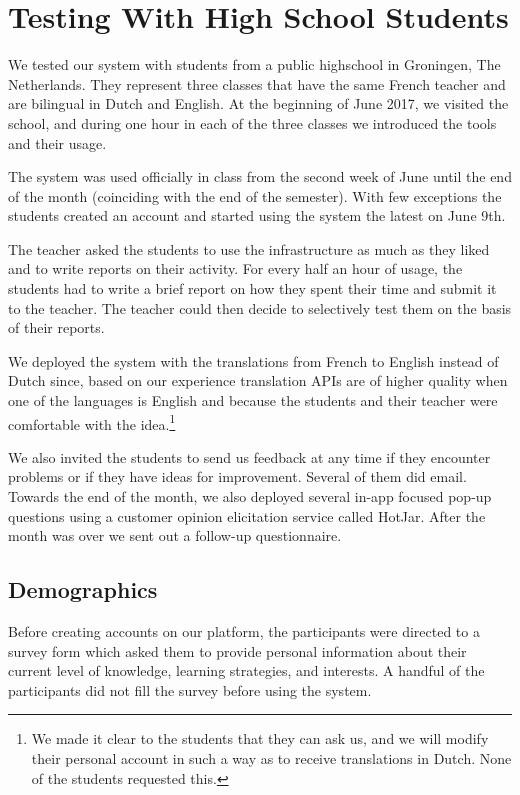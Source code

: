 
\newpage
\section{Testing With High School Students}
\label{sec:demographics}

We tested our system with \stcnt students from a public highschool in Groningen, The Netherlands. They represent three classes that have the same French teacher and are bilingual in Dutch and English. At the beginning of June 2017, we visited the school, and during one hour in each of the three classes we introduced the tools and their usage.

The system was used officially in class from the second week of June until the end of the month (coinciding with the end of the semester). With few exceptions the students created an account and started using the system the latest on June 9th. 

The teacher asked the students to use the infrastructure as much as they liked and to write reports on their activity. For every half an hour of usage, the students had to write a brief report on how they spent their time and submit it to the teacher. The teacher could then decide to selectively test them on the basis of their reports.

We deployed the system with the translations from French to English instead of Dutch since, based on our experience translation APIs are of higher quality when one of the languages is English and because the students and their teacher were comfortable with the idea.\footnote{We made it clear to the students that they can ask us, and we will modify their personal account in such a way as to receive translations in Dutch. None of the students requested this.}

We also invited the students to send us feedback at any time if they encounter problems or if they have ideas for improvement. Several of them did email. Towards the end of the month, we also deployed several in-app focused pop-up questions using a customer opinion elicitation service called HotJar. After the month was over we sent out a follow-up questionnaire.

\subsection{Demographics}

Before creating accounts on our platform, the participants were directed to a survey form which asked them to provide personal information about their current level of knowledge, learning strategies, and interests. A handful of the participants did not fill the survey before using the system.

